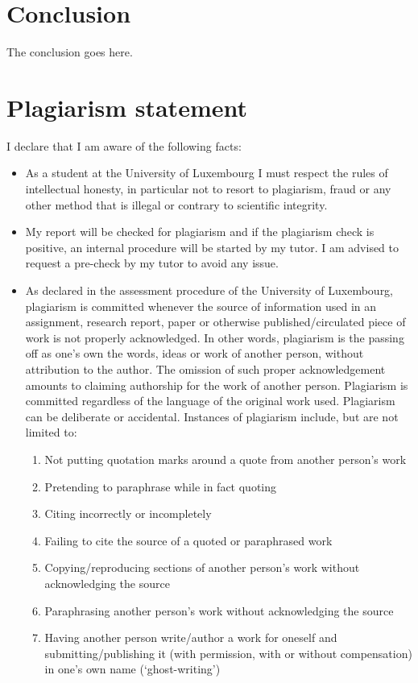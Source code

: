\documentclass[conference,compsoc]{IEEEtran}
\begin{document}
\section{Conclusion}
The conclusion goes here.
\section{Plagiarism statement}

I declare that I am aware of the following facts:
\begin{itemize}
	\item As a student at the University of Luxembourg I must respect the rules of intellectual honesty, in particular not to resort to plagiarism, fraud or any other method that is illegal or contrary to scientific integrity.
	\item My report will be checked for plagiarism and if the plagiarism check is positive, an internal procedure will be started by my tutor. I am advised to request a pre-check by my tutor to avoid any issue.
	\item As declared in the assessment procedure of the University of Luxembourg, plagiarism is committed whenever the source of information used in an assignment, research report, paper or otherwise published/circulated piece of work is not properly acknowledged. In other words, plagiarism is the passing off as one’s own the words, ideas or work of another person, without attribution to the author. The omission of such proper acknowledgement amounts to claiming authorship for the work of another person. Plagiarism is committed regardless of the language of the original work used. Plagiarism can be deliberate or accidental.
	Instances of plagiarism include, but are not limited to:
	\begin{enumerate}
		\item Not putting quotation marks around a quote from another person’s work
		\item Pretending to paraphrase while in fact quoting
		\item Citing incorrectly or incompletely
		\item Failing to cite the source of a quoted or paraphrased work
		\item Copying/reproducing sections of another person’s work without acknowledging the source
		\item Paraphrasing another person’s work without acknowledging the source
		\item Having another person write/author a work for oneself and submitting/publishing it (with permission, with or without compensation) in one’s own name (‘ghost-writing’)

\end{enumerate}
\end{itemize}
\end{document}
